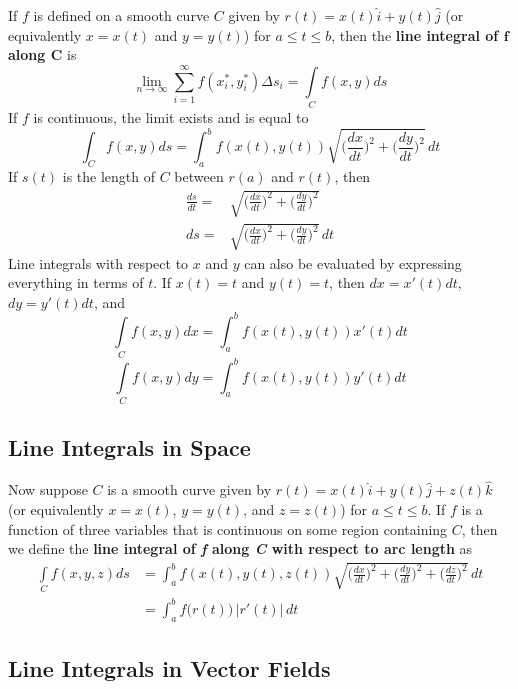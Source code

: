 If $f$ is defined on a smooth curve $C$ given by $r(t) = x(t)\hat{i} + y(t)\hat{j}$ (or equivalently $x = x(t)$ and $y = y(t)$) for $a \leq t \leq b$, then the \textbf{line integral of $\mathbf{f}$ along $\mathbf{C}$} is $$\lim_{n\to\infty} \sum_{i=1}^{\infty} f(x_i^*, y_i^*) \Delta s_i = \int\limits_C f(x,y) ds$$ If $f$ is continuous, the limit exists and is equal to $$ \int_C f(x,y) ds = \int_{a}^{b} f(x(t),y(t)) \sqrt{\Big( \frac{dx}{dt} \Big)^{2} + \Big( \frac{dy}{dt} \Big)^{2} } \, dt$$ If $s(t)$ is the length of $C$ between $r(a)$ and $r(t)$, then $$\begin{array}{cl}
    \frac{ds}{dt} =&\sqrt{\Big( \frac{dx}{dt} \Big)^{2} + \Big( \frac{dy}{dt} \Big)^{2} }\\
    ds =&\sqrt{\Big( \frac{dx}{dt} \Big)^{2} + \Big( \frac{dy}{dt} \Big)^{2} } \, dt
\end{array}$$ Line integrals with respect to $x$ and $y$ can also be evaluated by expressing everything in terms of $t$. If $x(t) = t$ and $y(t) = t$, then $dx = x'(t)dt$, $dy = y'(t)dt$, and $$\int\limits_{C} f(x,y) dx = \int_{a}^{b} f(x(t),y(t)) x'(t) dt $$ $$\int\limits_{C} f(x,y) dy = \int_{a}^{b} f(x(t),y(t)) y'(t) dt $$

\subsection{Line Integrals in Space}

Now suppose $C$ is a smooth curve given by $r(t) = x(t)\hat{i} + y(t)\hat{j} + z(t)\hat{k}$ (or equivalently $x = x(t)$, $y = y(t)$, and $z = z(t)$) for $a \leq t \leq b$. If $f$ is a function of three variables that is continuous on some region containing $C$, then we define the \textbf{line integral of \textit{f} along \textit{C} with respect to arc length} as $$\begin{aligned}
    \int\limits_C f(x,y,z) ds&= \int_a^b f(x(t), y(t), z(t)) \sqrt{\Big( \frac{dx}{dt} \Big)^2 + \Big( \frac{dy}{dt} \Big)^2 + \Big( \frac{dz}{dt} \Big)^2 } \, dt\\
    &=\int_a^b f \big(r(t)\big) \, | r'(t) | \, dt
\end{aligned}$$

\subsection{Line Integrals in Vector Fields}


